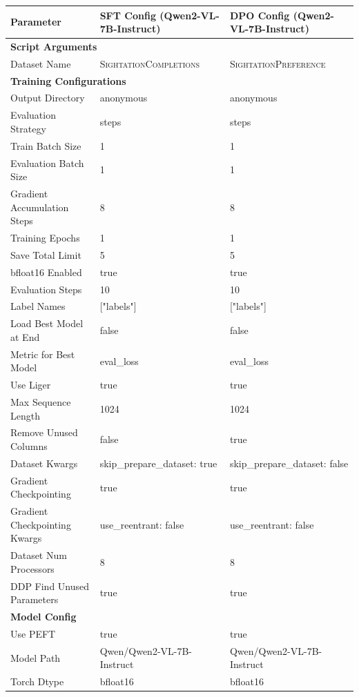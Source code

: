 \begin{table}[t]
\centering
\small
\begin{tabularx}{\textwidth}{lXX}
\toprule
\textbf{Parameter} & \textbf{SFT Config (Qwen2-VL-7B-Instruct)} & \textbf{DPO Config (Qwen2-VL-7B-Instruct)} \\ 
\midrule
\multicolumn{3}{l}{\textbf{Script Arguments}} \\
Dataset Name & \textsc{SightationCompletions}  &  \textsc{SightationPreference} \\
\midrule
\multicolumn{3}{l}{\textbf{Training Configurations}} \\
Output Directory & anonymous & anonymous \\
Evaluation Strategy & steps & steps \\
Train Batch Size & 1 & 1 \\
Evaluation Batch Size & 1 & 1 \\
Gradient Accumulation Steps & 8 & 8 \\
Training Epochs & 1 & 1 \\
Save Total Limit & 5 & 5 \\
bfloat16 Enabled & true & true \\
Evaluation Steps & 10 & 10 \\
Label Names & ["labels"] & ["labels"] \\
Load Best Model at End & false & false \\
Metric for Best Model & eval\_loss & eval\_loss \\
Use Liger & true & true \\
Max Sequence Length & 1024 & 1024 \\
Remove Unused Columns & false & true \\
Dataset Kwargs & skip\_prepare\_dataset: true & skip\_prepare\_dataset: false \\
Gradient Checkpointing & true & true \\
Gradient Checkpointing Kwargs & use\_reentrant: false & use\_reentrant: false \\
Dataset Num Processors & 8 & 8 \\
DDP Find Unused Parameters & true & true \\
\midrule
\multicolumn{3}{l}{\textbf{Model Config}} \\
Use PEFT & true & true \\
Model Path & Qwen/Qwen2-VL-7B-Instruct & Qwen/Qwen2-VL-7B-Instruct \\
Torch Dtype & bfloat16 & bfloat16 \\

\end{tabularx}
\end{table}
